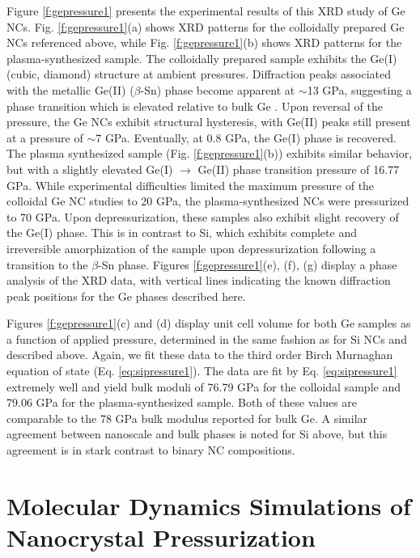 Figure \ref{f:gepressure1} presents the experimental results of this XRD study of Ge NCs. Fig. \ref{f:gepressure1}(a) shows XRD patterns for the colloidally prepared Ge NCs referenced above, while Fig. \ref{f:gepressure1}(b) shows XRD patterns for the plasma-synthesized sample.  The colloidally prepared sample exhibits the Ge(I) (cubic, diamond) structure at ambient pressures. Diffraction peaks associated with the metallic Ge(II) ($\beta$-Sn) phase become apparent at $\sim$13 GPa, suggesting a phase transition which is elevated relative to bulk Ge \cite{PhysRevB.34.362}. Upon reversal of the pressure, the Ge NCs exhibit structural hysteresis, with Ge(II) peaks still present at a pressure of $\sim$7 GPa. Eventually, at 0.8 GPa, the Ge(I) phase is recovered. The plasma synthesized sample (Fig. \ref{f:gepressure1}(b)) exhibits similar behavior, but with a slightly elevated Ge(I) $\rightarrow$ Ge(II) phase transition pressure of 16.77 GPa. While experimental difficulties limited the maximum pressure of the colloidal Ge NC studies to 20 GPa, the plasma-synthesized NCs were pressurized to 70 GPa.  Upon depressurization, these samples also exhibit slight recovery of the Ge(I) phase. This is in contrast to Si, which exhibits complete and irreversible amorphization of the sample upon depressurization following a transition to the $\beta$-Sn phase. Figures \ref{f:gepressure1}(e), (f), (g) display a phase analysis of the XRD data, with vertical lines indicating the known diffraction peak positions for the Ge phases described here. \par
Figures \ref{f:gepressure1}(c) and (d) display unit cell volume for both Ge samples as a function of applied pressure, determined in the same fashion as for Si NCs and described above. Again, we fit these data to the third order Birch Murnaghan equation of state (Eq. \ref{eq:sipressure1}). The data are fit by Eq. \ref{eq:sipressure1} extremely well and yield bulk moduli of 76.79 GPa for the colloidal sample and 79.06 GPa for the plasma-synthesized sample. Both of these values are comparable to the 78 GPa bulk modulus reported for bulk Ge. A similar agreement between nanoscale and bulk phases is noted for Si above, but this agreement is in stark contrast to binary NC compositions. 

\section{Molecular Dynamics Simulations of Nanocrystal Pressurization}

